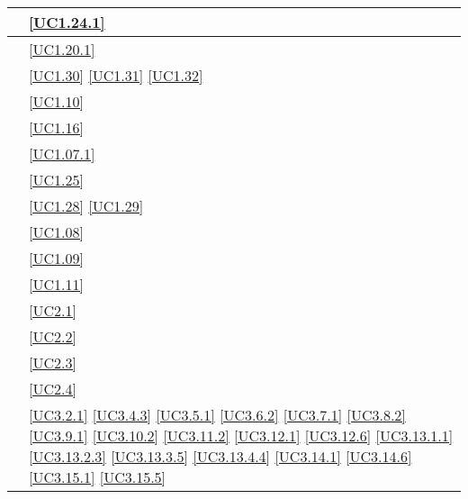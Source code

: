 \begin{longtable}{|P{6cm}|P{6cm}|}
	\hline {} & \ref{UC1.24.1} \\
	\hline {} & \ref{UC1.20.1} \\	
	\hline {} & \ref{UC1.30} \linebreak \ref{UC1.31} \linebreak \ref{UC1.32} \\
	\hline {} & \ref{UC1.10} \\
	\hline {} & \ref{UC1.16} \\
	\hline {} & \ref{UC1.07.1} \\
	\hline {} & \ref{UC1.25} \\
	\hline {} & \ref{UC1.28} \linebreak \ref{UC1.29}  \\	 
	\hline {} & \ref{UC1.08} \\
	\hline {} & \ref{UC1.09} \\
	\hline {} & \ref{UC1.11} \\	
	\hline {} & \ref{UC2.1} \\
	\hline {} & \ref{UC2.2} \\
	\hline {} & \ref{UC2.3} \\
	\hline {} & \ref{UC2.4} \\	
	\hline {} & \ref{UC3.2.1} \linebreak \ref{UC3.4.3} \linebreak \ref{UC3.5.1} \linebreak \ref{UC3.6.2} \linebreak \ref{UC3.7.1} \linebreak \ref{UC3.8.2} \linebreak \ref{UC3.9.1} \linebreak \ref{UC3.10.2} \linebreak \ref{UC3.11.2} \linebreak  \ref{UC3.12.1} \linebreak \ref{UC3.12.6} \linebreak  \ref{UC3.13.1.1} \linebreak \ref{UC3.13.2.3} \linebreak \ref{UC3.13.3.5} \linebreak \ref{UC3.13.4.4} \linebreak \ref{UC3.14.1} \linebreak \ref{UC3.14.6} \linebreak \ref{UC3.15.1} \linebreak \ref{UC3.15.5} \\

\end{longtable}
